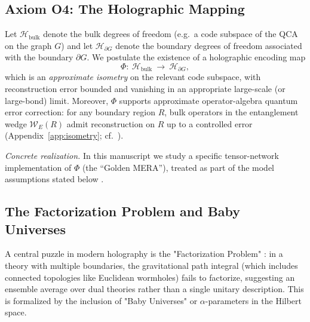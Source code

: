 \subsection{Axiom O4: The Holographic Mapping}
\begin{axiom}
Let $\mathcal{H}_{\text{bulk}}$ denote the bulk degrees of freedom (e.g.\ a code subspace of the QCA on the graph $G$) and let $\mathcal{H}_{\partial G}$ denote the boundary degrees of freedom associated with the boundary $\partial G$. We postulate the existence of a holographic encoding map
\begin{equation}
    \Phi:\ \mathcal{H}_{\text{bulk}}\ \to\ \mathcal{H}_{\partial G},
\end{equation}
which is an \emph{approximate isometry} on the relevant code subspace, with reconstruction error bounded and vanishing in an appropriate large-scale (or large-bond) limit. Moreover, $\Phi$ supports approximate operator-algebra quantum error correction: for any boundary region $R$, bulk operators in the entanglement wedge $\mathcal{W}_E(R)$ admit reconstruction on $R$ up to a controlled error (Appendix~\ref{app:isometry}; cf.\ \cite{AlmheiriDongHarlow2015,Pastawski2015,Harlow2017}).
\end{axiom}
\noindent\textit{Concrete realization.} In this manuscript we study a specific tensor-network implementation of $\Phi$ (the ``Golden MERA''), treated as part of the model assumptions stated below \cite{Vidal2007MERA,Swingle2012MERA}.

\subsection{The Factorization Problem and Baby Universes}
A central puzzle in modern holography is the "Factorization Problem" \cite{Harlow2021}: in a theory with multiple boundaries, the gravitational path integral (which includes connected topologies like Euclidean wormholes) fails to factorize, suggesting an ensemble average over dual theories rather than a single unitary description. This is formalized by the inclusion of "Baby Universes" or $\alpha$-parameters in the Hilbert space.


